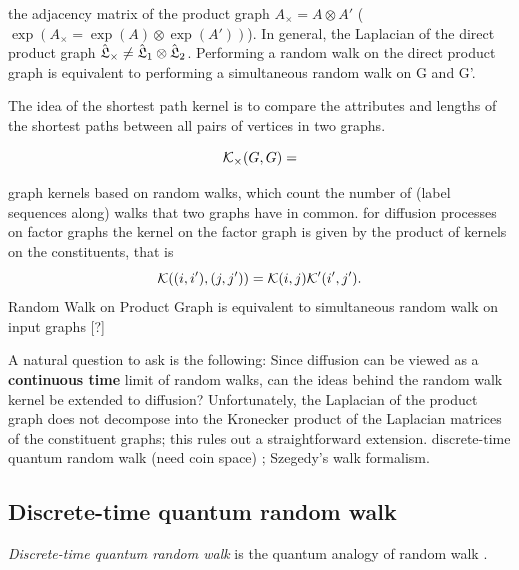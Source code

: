 \begin{fact}
	the adjacency matrix of the product graph $A_{\times}=A\otimes A'$ ($\exp(A_{\times}=\exp(A)\otimes \exp(A'))$).	
	In general, the Laplacian of the direct product graph 
	$\hat{\mathfrak{L}}_{\times}\neq \hat{\mathfrak{L}}_1\otimes \hat{\mathfrak{L}}_2$.
	Performing a random walk on the direct product graph is equivalent to performing a simultaneous random walk on G and G'.
\end{fact}
The idea of the shortest path kernel is to compare the attributes and lengths of the shortest paths between all pairs of vertices in two graphs.
\begin{definition}
	\begin{equation}
		\mathcal{K}_{\times}(G,G) = 
	\end{equation}
\end{definition}
graph kernels based on random walks, which count the number of (label sequences along) walks that two graphs have in common.
for diffusion processes on factor graphs the kernel on the factor graph is given by the product of kernels on the constituents, that is 
\begin{equation}
	\mathcal{K}((i, i'), (j, j')) = \mathcal{K}(i, j) \mathcal{K}' (i' , j' ).
\end{equation}
Random Walk on Product Graph is equivalent to simultaneous random walk on input graphs [?]
\begin{remark}
	A natural question to ask is the following: Since diffusion can be viewed as a \textbf{continuous time} limit of random walks, can the ideas behind the random walk kernel be extended to diffusion? Unfortunately, the Laplacian of the product graph does not decompose into the Kronecker product of the Laplacian matrices of the constituent graphs; this rules out a straightforward extension.
	discrete-time quantum random walk (need coin space) \cite{ambainisCoinsMakeQuantum2005} \cite{childsQuantumInformationProcessing2004};
	Szegedy's walk formalism.
	\cite{szegedySpectraQuantizedWalks2004}
\end{remark}

\subsection{Discrete-time quantum random walk}
\emph{Discrete-time quantum random walk} is the quantum analogy of random walk
\cite{ambainisOnedimensionalQuantumWalks2001}.
\cite{baiQuantumKernelsUnattributed2017}

